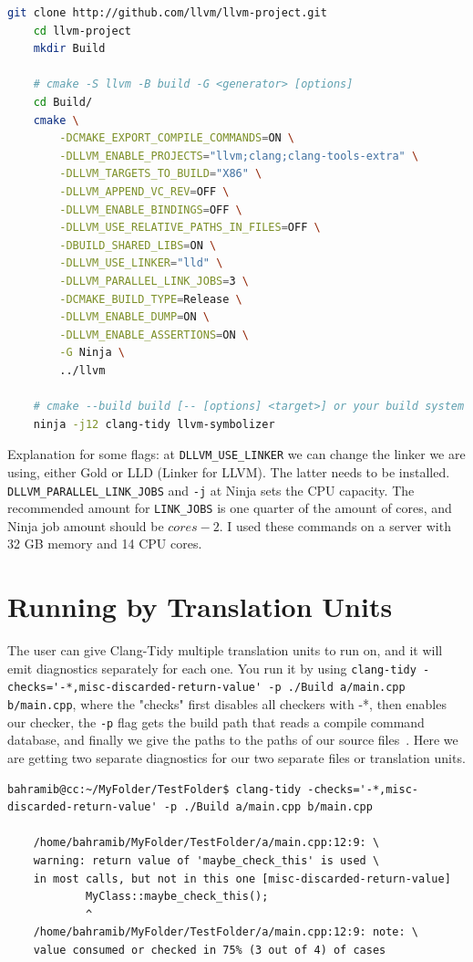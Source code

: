 \begin{lstlisting}[language={bash}]
	git clone http://github.com/llvm/llvm-project.git
	cd llvm-project
	mkdir Build

	# cmake -S llvm -B build -G <generator> [options]
	cd Build/
	cmake \
		-DCMAKE_EXPORT_COMPILE_COMMANDS=ON \
		-DLLVM_ENABLE_PROJECTS="llvm;clang;clang-tools-extra" \
		-DLLVM_TARGETS_TO_BUILD="X86" \
		-DLLVM_APPEND_VC_REV=OFF \
		-DLLVM_ENABLE_BINDINGS=OFF \
		-DLLVM_USE_RELATIVE_PATHS_IN_FILES=OFF \
		-DBUILD_SHARED_LIBS=ON \
		-DLLVM_USE_LINKER="lld" \
		-DLLVM_PARALLEL_LINK_JOBS=3 \
		-DCMAKE_BUILD_TYPE=Release \
		-DLLVM_ENABLE_DUMP=ON \
		-DLLVM_ENABLE_ASSERTIONS=ON \
		-G Ninja \
		../llvm
	
	# cmake --build build [-- [options] <target>] or your build system specified above directly.
	ninja -j12 clang-tidy llvm-symbolizer
\end{lstlisting}

Explanation for some flags: at \texttt{DLLVM\_USE\_LINKER} we can change the linker we are using, either Gold or LLD (Linker for LLVM). The
latter needs to be installed. \texttt{DLLVM\_PARALLEL\_LINK\_JOBS} and \texttt{-j} at Ninja sets the CPU capacity. The recommended amount for
\texttt{LINK\_JOBS} is one quarter of the amount of cores, and Ninja job amount should be $cores - 2$. I used these commands on a
server with 32 GB memory and 14 CPU cores.


\section{Running by Translation Units}
\label{by-TU}

The user can give Clang-Tidy multiple translation units to run on, and it will emit diagnostics separately for each one. You run it by
using \lstinline{clang-tidy -checks='-*,misc-discarded-return-value' -p ./Build a/main.cpp b/main.cpp},
where the "checks" first disables all checkers with -*, then enables our checker, the \texttt{-p} flag gets the build path that reads a
compile command database, and finally we give the paths to the paths of our source files~\cite{flags}. Here we are getting two separate diagnostics
for our two separate files or translation units.

\begin{lstlisting}[caption={Diagnostic output without project-level knowledge.},captionpos=b]
	bahramib@cc:~/MyFolder/TestFolder$ clang-tidy -checks='-*,misc-discarded-return-value' -p ./Build a/main.cpp b/main.cpp

	/home/bahramib/MyFolder/TestFolder/a/main.cpp:12:9: \
	warning: return value of 'maybe_check_this' is used \
	in most calls, but not in this one [misc-discarded-return-value]
			MyClass::maybe_check_this();
			^
	/home/bahramib/MyFolder/TestFolder/a/main.cpp:12:9: note: \
	value consumed or checked in 75% (3 out of 4) of cases
\end{lstlisting}



